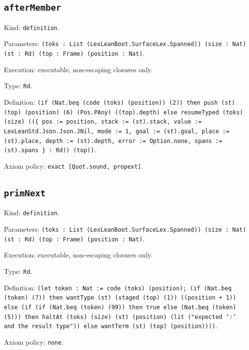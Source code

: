 \documentclass[11pt]{article}
\begin{document}
\subsection*{\texttt{afterMember}}
\noindent Kind: \texttt{definition}.\par
\noindent Parameters: \texttt{(toks : List (LexLeanBoot.SurfaceLex.Spanned)) (size : Nat) (st : Rd) (top : Frame) (position : Nat)}.\par
\noindent Execution: executable, non-escaping closures only.\par
\noindent Type: \texttt{Rd}.\par
\noindent Definition: \texttt{(if (Nat.beq (code (toks) (position)) (2)) then push (st) (top) (position) (6) (Pos.PAny) ((top).depth) else resumeTyped (toks) (size) ((\{ pos := position, stack := (st).stack, value := LexLeanStd.Json.Json.JNil, mode := 1, goal := (st).goal, place := (st).place, depth := (st).depth, error := Option.none, spans := (st).spans \} : Rd)) (top))}.\par
\noindent Axiom policy: \texttt{exact [Quot.sound, propext]}.\par
\subsection*{\texttt{primNext}}
\noindent Kind: \texttt{definition}.\par
\noindent Parameters: \texttt{(toks : List (LexLeanBoot.SurfaceLex.Spanned)) (size : Nat) (st : Rd) (top : Frame) (position : Nat)}.\par
\noindent Execution: executable, non-escaping closures only.\par
\noindent Type: \texttt{Rd}.\par
\noindent Definition: \texttt{(let token : Nat := code (toks) (position); (if (Nat.beq (token) (7)) then wantType (st) (staged (top) (1)) ((position + 1)) else (if (if (Nat.beq (token) (99)) then true else (Nat.beq (token) (5))) then haltAt (toks) (size) (st) (position) (lit ("expected `:` and the result type")) else wantTerm (st) (top) (position))))}.\par
\noindent Axiom policy: \texttt{none}.\par
\end{document}
